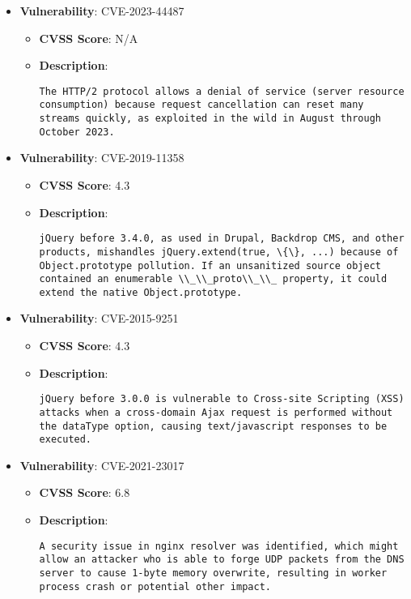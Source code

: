 \documentclass{article}
\begin{document}
\begin{itemize}
    
        \item \textbf{Vulnerability}: CVE-2023-44487
        \begin{itemize}
            \item \textbf{CVSS Score}:  N/A 
            \item \textbf{Description}:
            \parbox[t]{0.9\linewidth}{
                \verb|The HTTP/2 protocol allows a denial of service (server resource consumption) because request cancellation can reset many streams quickly, as exploited in the wild in August through October 2023.|
            }
        \end{itemize}
    
        \item \textbf{Vulnerability}: CVE-2019-11358
        \begin{itemize}
            \item \textbf{CVSS Score}:  4.3 
            \item \textbf{Description}:
            \parbox[t]{0.9\linewidth}{
                \verb|jQuery before 3.4.0, as used in Drupal, Backdrop CMS, and other products, mishandles jQuery.extend(true, \{\}, ...) because of Object.prototype pollution. If an unsanitized source object contained an enumerable \\_\\_proto\\_\\_ property, it could extend the native Object.prototype.|
            }
        \end{itemize}
    
        \item \textbf{Vulnerability}: CVE-2015-9251
        \begin{itemize}
            \item \textbf{CVSS Score}:  4.3 
            \item \textbf{Description}:
            \parbox[t]{0.9\linewidth}{
                \verb|jQuery before 3.0.0 is vulnerable to Cross-site Scripting (XSS) attacks when a cross-domain Ajax request is performed without the dataType option, causing text/javascript responses to be executed.|
            }
        \end{itemize}
    
        \item \textbf{Vulnerability}: CVE-2021-23017
        \begin{itemize}
            \item \textbf{CVSS Score}:  6.8 
            \item \textbf{Description}:
            \parbox[t]{0.9\linewidth}{
                \verb|A security issue in nginx resolver was identified, which might allow an attacker who is able to forge UDP packets from the DNS server to cause 1-byte memory overwrite, resulting in worker process crash or potential other impact.|
            }
        \end{itemize}
    

\end{itemize}
\end{document}
